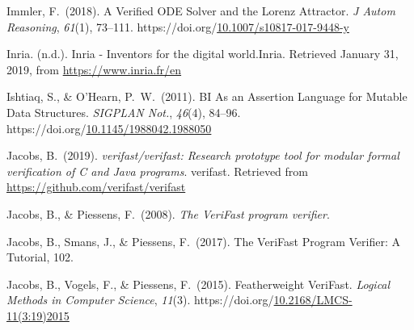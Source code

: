 \documentclass[12pt,twoside]{article}
\begin{document}
{\begin{thebibliography}{222}
\mdbibitemlabel{}Immler, F.~(2018). A Verified ODE Solver and the Lorenz Attractor. \emph{J Autom Reasoning}, \emph{61}(1), 73–111. https://doi.org/\href{https://dx.doi.org/10.1007/s10817-017-9448-y}{10.1007/s10817-017-9448-y}\label{immler_verified_2018}%

\mdbibitemlabel{}Inria. (n.d.). Inria - Inventors for the digital world.Inria. Retrieved January 31, 2019, from \href{https://www.inria.fr/en}{{\ttfamily https://\hspace{0pt}www.\hspace{0pt}inria.\hspace{0pt}fr/\hspace{0pt}en}}\label{inria_inria_nodate}%

\mdbibitemlabel{}Ishtiaq, S., \& O’Hearn, P.~W.~(2011). BI As an Assertion Language for Mutable Data Structures. \emph{SIGPLAN Not.}, \emph{46}(4), 84–96. https://doi.org/\href{https://dx.doi.org/10.1145/1988042.1988050}{10.1145/1988042.1988050}\label{ishtiaq_bi_2011}%

\mdbibitemlabel{}Jacobs, B.~(2019). \emph{verifast/verifast: Research prototype tool for modular formal verification of C and Java programs}. verifast. Retrieved from \href{https://github.com/verifast/verifast}{{\ttfamily https://\hspace{0pt}github.\hspace{0pt}com/\hspace{0pt}verifast/\hspace{0pt}verifast}}\label{jacobs_verifast/verifast:_2019}%

\mdbibitemlabel{}Jacobs, B., \& Piessens, F.~(2008). \emph{The VeriFast program verifier}.\label{jacobs_verifast_2008}%

\mdbibitemlabel{}Jacobs, B., Smans, J., \& Piessens, F.~(2017). The VeriFast Program Veriﬁer: A Tutorial, 102.\label{jacobs_verifast_2017}%

\mdbibitemlabel{}Jacobs, B., Vogels, F., \& Piessens, F.~(2015). Featherweight VeriFast. \emph{Logical Methods in Computer Science}, \emph{11}(3). https://doi.org/\href{https://dx.doi.org/10.2168/LMCS-11\%25283:19\%25292015}{10.2168/LMCS-11(3:19)2015}\label{jacobs_featherweight_2015}%


\end{thebibliography}}
\end{document}
